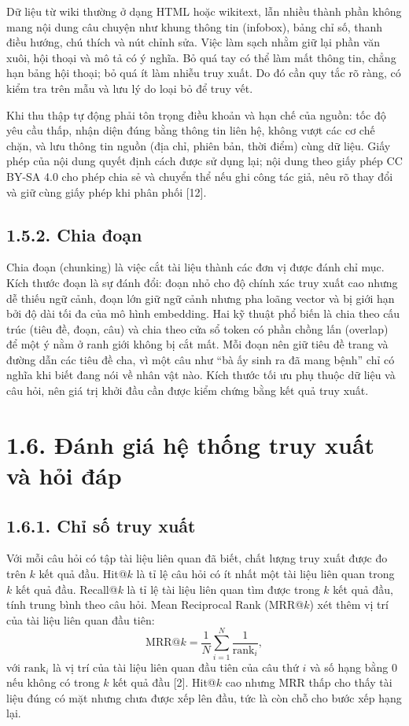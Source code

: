 Dữ liệu từ wiki thường ở dạng HTML hoặc wikitext, lẫn nhiều thành phần không mang nội dung câu chuyện như khung thông tin (infobox), bảng chỉ số, thanh điều hướng, chú thích và nút chỉnh sửa. Việc làm sạch nhằm giữ lại phần văn xuôi, hội thoại và mô tả có ý nghĩa. Bỏ quá tay có thể làm mất thông tin, chẳng hạn bảng hội thoại; bỏ quá ít làm nhiễu truy xuất. Do đó cần quy tắc rõ ràng, có kiểm tra trên mẫu và lưu lý do loại bỏ để truy vết.


Khi thu thập tự động phải tôn trọng điều khoản và hạn chế của nguồn: tốc độ yêu cầu thấp, nhận diện đúng bằng thông tin liên hệ, không vượt các cơ chế chặn, và lưu thông tin nguồn (địa chỉ, phiên bản, thời điểm) cùng dữ liệu. Giấy phép của nội dung quyết định cách được sử dụng lại; nội dung theo giấy phép CC BY-SA 4.0 cho phép chia sẻ và chuyển thể nếu ghi công tác giả, nêu rõ thay đổi và giữ cùng giấy phép khi phân phối [12].


\subsection{1.5.2. Chia đoạn}

Chia đoạn (chunking) là việc cắt tài liệu thành các đơn vị được đánh chỉ mục. Kích thước đoạn là sự đánh đổi: đoạn nhỏ cho độ chính xác truy xuất cao nhưng dễ thiếu ngữ cảnh, đoạn lớn giữ ngữ cảnh nhưng pha loãng vector và bị giới hạn bởi độ dài tối đa của mô hình embedding. Hai kỹ thuật phổ biến là chia theo cấu trúc (tiêu đề, đoạn, câu) và chia theo cửa sổ token có phần chồng lấn (overlap) để một ý nằm ở ranh giới không bị cắt mất. Mỗi đoạn nên giữ tiêu đề trang và đường dẫn các tiêu đề cha, vì một câu như ``bà ấy sinh ra đã mang bệnh'' chỉ có nghĩa khi biết đang nói về nhân vật nào. Kích thước tối ưu phụ thuộc dữ liệu và câu hỏi, nên giá trị khởi đầu cần được kiểm chứng bằng kết quả truy xuất.


\section{1.6. Đánh giá hệ thống truy xuất và hỏi đáp}

\subsection{1.6.1. Chỉ số truy xuất}

Với mỗi câu hỏi có tập tài liệu liên quan đã biết, chất lượng truy xuất được đo trên $k$ kết quả đầu. Hit@$k$ là tỉ lệ câu hỏi có ít nhất một tài liệu liên quan trong $k$ kết quả đầu. Recall@$k$ là tỉ lệ tài liệu liên quan tìm được trong $k$ kết quả đầu, tính trung bình theo câu hỏi. Mean Reciprocal Rank (MRR@$k$) xét thêm vị trí của tài liệu liên quan đầu tiên:
\begin{equation*}
\mathrm{MRR@}k=\frac{1}{N}\sum_{i=1}^{N}\frac{1}{\mathrm{rank}_i},
\end{equation*}
với $\mathrm{rank}_i$ là vị trí của tài liệu liên quan đầu tiên của câu thứ $i$ và số hạng bằng 0 nếu không có trong $k$ kết quả đầu [2]. Hit@$k$ cao nhưng MRR thấp cho thấy tài liệu đúng có mặt nhưng chưa được xếp lên đầu, tức là còn chỗ cho bước xếp hạng lại.


